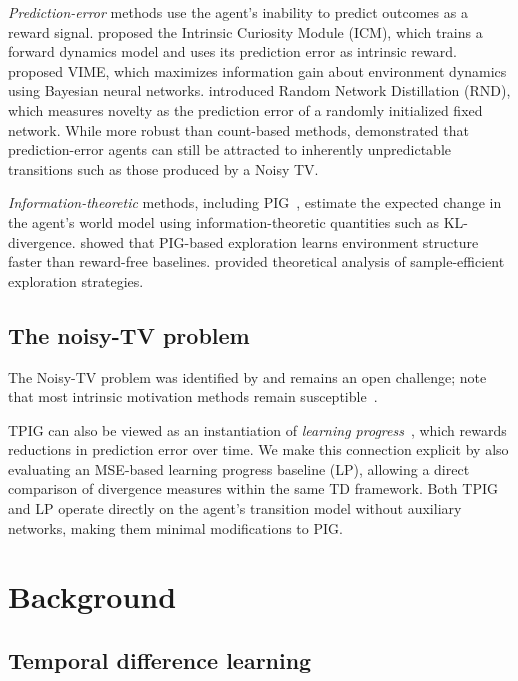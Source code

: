 \documentclass[letterpaper]{article}
\begin{document}
\emph{Prediction-error} methods use the agent's inability to predict
outcomes as a reward signal.  \citet{Pathak2017ICM} proposed the
Intrinsic Curiosity Module (ICM), which trains a forward dynamics
model and uses its prediction error as intrinsic reward.
\citet{Rein:VIME} proposed VIME, which maximizes information gain
about environment dynamics using Bayesian neural networks.
\citet{Burda2019RND} introduced Random Network Distillation (RND),
which measures novelty as the prediction error of a randomly
initialized fixed network.  While more robust than count-based
methods, \citet{Burda2019curiosity} demonstrated that prediction-error
agents can still be attracted to inherently unpredictable transitions
such as those produced by a Noisy TV.

\emph{Information-theoretic} methods, including PIG~\citep{10.3389/fncir.2013.00037},
estimate the expected change in the agent's world model using
information-theoretic quantities such as KL-divergence.
\citet{10.3389/fncir.2013.00037} showed that PIG-based exploration
learns environment structure faster than reward-free baselines.
\citet{DBLP:journals/corr/abs-2007-13442} provided theoretical
analysis of sample-efficient exploration strategies.

\subsection{The noisy-TV problem}

The Noisy-TV problem was identified by \citet{Burda2019curiosity} and
remains an open challenge; \citet{Ladosz_2022} note that most
intrinsic motivation methods remain
susceptible~\citep{DBLP:journals/corr/abs-2008-04388}.

TPIG can also be viewed as an instantiation of \emph{learning
progress}~\citep{Oudeyer2007intrinsic}, which rewards reductions in
prediction error over time.  We make this connection explicit by
also evaluating an MSE-based learning progress baseline (LP), allowing
a direct comparison of divergence measures within the same TD
framework.  Both TPIG and LP operate directly on the agent's
transition model without auxiliary networks, making them minimal
modifications to PIG.

\section{Background}

\subsection{Temporal difference learning}
\end{document}
